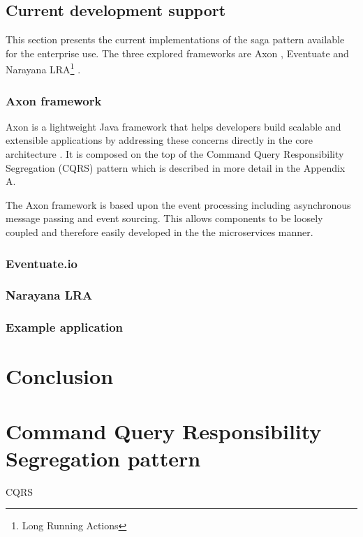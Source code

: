 \documentclass[oneside,
  digital, %
  table,   %
  nolof,     %
  nolot,     %
]{fithesis3}
\begin{document}
\section{Current development support}

This section presents the current implementations of the saga pattern available for the enterprise use. The three explored frameworks are Axon \cite{axon_framework}, Eventuate \cite{eventuate.io} and Narayana LRA\footnote{Long Running Actions} \cite{narayana_lra}.

\subsection{Axon framework}

Axon is a lightweight Java framework that helps developers build scalable and extensible applications by addressing these concerns directly in the core  architecture \cite{axon_framework}. It is composed on the top of the Command Query Responsibility Segregation (CQRS) pattern which is described in more detail in the Appendix A.

The Axon framework is based upon the event processing including asynchronous message passing and event sourcing. This allows components to be loosely coupled and therefore easily developed in the the microservices manner.

\subsection{Eventuate.io}

\subsection{Narayana LRA}

\subsection{Example application}


\chapter{Conclusion}



\makeatletter\thesis@blocks@clear\makeatother
{} %
\printindex




\appendix %

\chapter{Command Query Responsibility Segregation pattern}

CQRS
\end{document}
